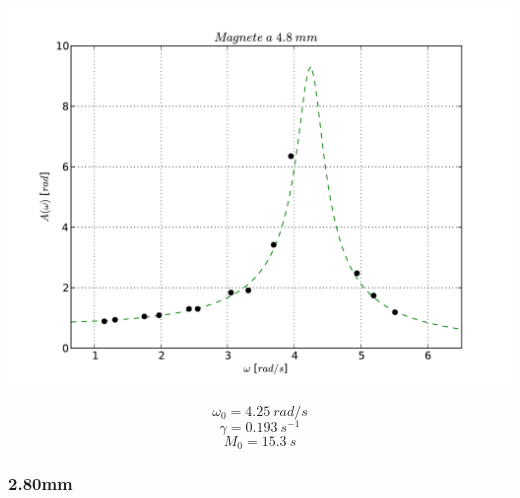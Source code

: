 \begin{center}

\includegraphics[scale=0.75]{"../grafici/Magnetea48mm"}

$$ \omega_0 = 4.25\ rad/s $$
$$ \gamma = 0.193\ s^{-1}$$
$$ M_0 = 15.3\ s$$


\end{center}
 
 
\subsubsection{2.80mm}

